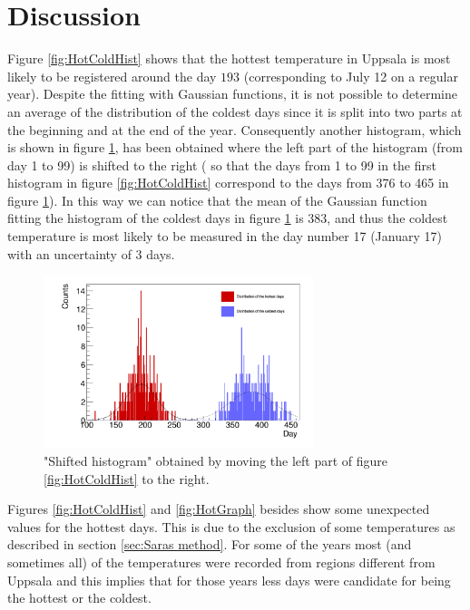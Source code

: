 \section{Discussion}\label{sec:Discussion}
Figure \ref{fig:HotColdHist} shows that the hottest temperature in Uppsala is most likely to be registered around the day $193$ (corresponding to July 12 on a regular year). Despite the fitting with Gaussian functions, it is not possible to determine an average of the distribution of the coldest days since it is split into two parts at the beginning and at the end of the year. Consequently another histogram, which is shown in figure \ref{fig:HotColdHist2}, has been obtained where the left part of the histogram (from day 1 to 99) is shifted to the right ( so that the days from 1 to 99 in the first histogram in figure \ref{fig:HotColdHist} correspond to the days from 376 to 465 in figure \ref{fig:HotColdHist2}). In this way we can notice that the mean of the Gaussian function fitting the histogram of the coldest days in figure \ref{fig:HotColdHist2} is 383, and thus the coldest temperature is most likely to be measured in the day number 17 (January 17) with an uncertainty of 3 days.

\begin{figure}[H]
\begin{center}
\includegraphics[width=0.7\textwidth]{HotCold_shifted.png}
\caption{"Shifted histogram" obtained by moving the left part of figure \ref{fig:HotColdHist} to the right.}
\label{fig:HotColdHist2}
\end{center}
\end{figure}


Figures \ref{fig:HotColdHist} and \ref{fig:HotGraph} besides show some unexpected values for the hottest days. This is due to the exclusion of some temperatures as described in section
\ref{sec:Saras method}. For some of the years most (and sometimes all) of the temperatures were recorded from regions
different from Uppsala and this implies that for those years less days were candidate for being the hottest or the coldest. 

